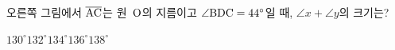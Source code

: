 \noindent\begin{minipage}[t]{0.58\linewidth}\vspace{0pt}\raggedright 오른쪽 그림에서 $\overline{\mathrm{AC}}$는 원~$\mathrm{O}$의 지름이고 $\angle\mathrm{BDC}=44^\circ$일 때, $\angle x+\angle y$의 크기는?\end{minipage}\hfill\begin{minipage}[t]{0.4\linewidth}\vspace{0pt}\centering \resizebox{\ifdim\width>\linewidth\linewidth\else\width\fi}{!}{}\end{minipage}\par
\begin{choicesii}{$130^\circ$}{$132^\circ$}{$134^\circ$}{$136^\circ$}{$138^\circ$}\end{choicesii}
